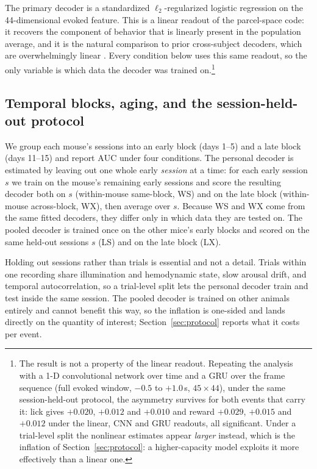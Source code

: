 \documentclass{article}
\newcommand{\auc}{\mathrm{AUC}}
\begin{document}
The primary decoder is a standardized $\ell_2$-regularized logistic regression on
the 44-dimensional evoked feature. This is a linear readout of the parcel-space code: it recovers the
component of behavior that is linearly present in the population average, and it is the natural
comparison to prior cross-subject decoders, which are overwhelmingly linear
\citep{melbaum2022,peterson2021}. Every condition below uses this same readout, so the only variable
is which data the decoder was trained on.\footnote{The result is not a property of the linear
readout. Repeating the analysis with a 1-D convolutional network over time and a GRU over the frame
sequence (full evoked window, $-0.5$ to $+1.0$\,s, $45 \times 44$), under the same session-held-out
protocol, the asymmetry survives for both events that carry it: lick gives $+0.020$, $+0.012$ and
$+0.010$ and reward $+0.029$, $+0.015$ and $+0.012$ under the linear, CNN and GRU readouts, all
significant. Under a trial-level split the nonlinear estimates appear \emph{larger} instead, which is
the inflation of Section~\ref{sec:protocol}: a higher-capacity model exploits it more effectively
than a linear one.}

\subsection{Temporal blocks, aging, and the session-held-out protocol}
\label{sec:blocks}
We group each mouse's sessions into an early block (days 1--5)
and a late block (days 11--15) and report $\auc$ under four conditions. The personal decoder is
estimated by leaving out one whole early \emph{session} at a time: for each early session $s$ we
train on the mouse's remaining early sessions and score the resulting decoder both on $s$
(within-mouse same-block, WS) and on the late block (within-mouse across-block, WX), then average
over $s$. Because WS and WX come from the same fitted decoders, they differ only in which data they
are tested on. The pooled decoder is trained once on the other mice's early blocks and scored on the
same held-out sessions $s$ (LS) and on the late block (LX).

Holding out sessions rather than trials is essential and not a detail. Trials within one recording
share illumination and hemodynamic state, slow arousal drift, and temporal autocorrelation, so a
trial-level split lets the personal decoder train and test inside the same session. The pooled
decoder is trained on other animals entirely and cannot benefit this way, so the inflation is
one-sided and lands directly on the quantity of interest; Section~\ref{sec:protocol} reports what it
costs per event.
\end{document}
